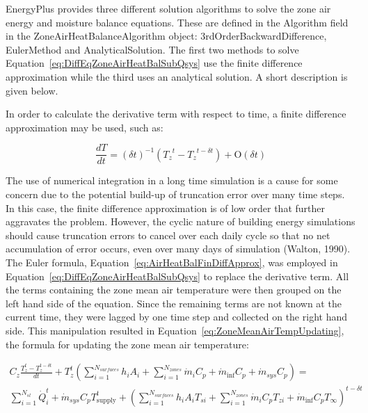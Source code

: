 EnergyPlus provides three different solution algorithms to solve the zone air energy and moisture balance equations. These are defined in the Algorithm field in the ZoneAirHeatBalanceAlgorithm object: 3rdOrderBackwardDifference, EulerMethod and AnalyticalSolution. The first two methods to solve Equation~\ref{eq:DiffEqZoneAirHeatBalSubQsys} use the finite difference approximation while the third uses an analytical solution. A short description is given below.

In order to calculate the derivative term with respect to time, a finite difference approximation may be used, such as:

\begin{equation}
\frac{{dT}}{{dt}} = {\left( {\delta t} \right)^{ - 1}}\left( {{T_z}^t - {T_z}^{t - \delta t}} \right) + \mathrm{O}\left( {\delta t} \right)
\label{eq:AirHeatBalFinDiffApprox}
\end{equation}

The use of numerical integration in a long time simulation is a cause for some concern due to the potential build-up of truncation error over many time steps. In this case, the finite difference approximation is of low order that further aggravates the problem. However, the cyclic nature of building energy simulations should cause truncation errors to cancel over each daily cycle so that no net accumulation of error occurs, even over many days of simulation (Walton, 1990). The Euler formula, Equation~\ref{eq:AirHeatBalFinDiffApprox}, was employed in Equation~\ref{eq:DiffEqZoneAirHeatBalSubQsys} to replace the derivative term. All the terms containing the zone mean air temperature were then grouped on the left hand side of the equation. Since the remaining terms are not known at the current time, they were lagged by one time step and collected on the right hand side. This manipulation resulted in Equation~\ref{eq:ZoneMeanAirTempUpdating}, the formula for updating the zone mean air temperature:

\begin{equation}
\begin{array}{l}{C_z}\frac{{T_z^t - T_z^{t - \delta t}}}{{dt}} + T_z^t\left( {\sum\limits_{i = 1}^{{N_{surfaces}}} {{h_i}} {A_i} + \sum\limits_{i = 1}^{{N_{zones}}} {{{\dot m}_i}} {C_p} + {{\dot m}_{\inf }}{C_p} + {{\dot m}_{sys}}{C_p}} \right) = \\\sum\limits_{i = 1}^{{N_{sl}}} {\dot Q_i^t}  + {{\dot m}_{sys}}{C_p}T_{{\mathrm{supply}}}^t + {\left( {\sum\limits_{i = 1}^{{N_{surfaces}}} {{h_i}} {A_i}{T_{si}} + \sum\limits_{i = 1}^{{N_{zones}}} {{{\dot m}_i}} {C_p}{T_{zi}} + {{\dot m}_{\inf }}{C_p}{T_\infty }} \right)^{t - \delta t}}\end{array}
\label{eq:ZoneMeanAirTempUpdating}
\end{equation}


